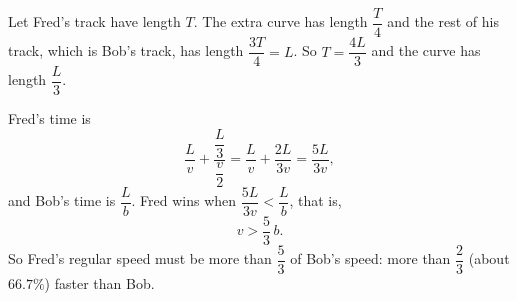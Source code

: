 Let Fred's track have length $T$. The extra curve has length $\dfrac T4$ and the rest of his track, which is Bob's track, has length $\dfrac{3T}{4}=L$. So $T=\dfrac{4L}{3}$ and the curve has length $\dfrac L3$.

Fred's time is
\[\dfrac{L}{v}+\dfrac{\dfrac L3}{\dfrac v2}=\dfrac Lv+\dfrac{2L}{3v}=\dfrac{5L}{3v},\]
and Bob's time is $\dfrac Lb$. Fred wins when $\dfrac{5L}{3v}<\dfrac Lb$, that is,
\[\boxed{v>\dfrac53\,b}.\]
So Fred's regular speed must be more than $\dfrac53$ of Bob's speed: more than $\dfrac23$ (about $66.7\%$) faster than Bob.
